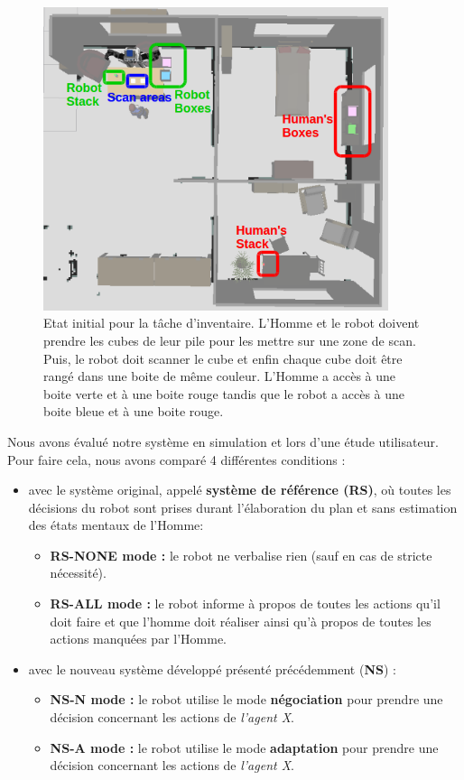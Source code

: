 \documentclass[english,a4paper,11pt,twoside]{StyleThese}
\begin{document}
\begin{figure}[!h]
	\centering
    \includegraphics[width=0.9\textwidth]{figs/Chapter5/SetUpSimu.png}
    \caption{Etat initial pour la tâche d'inventaire. L'Homme et le robot doivent prendre les cubes de leur pile pour les mettre sur une zone de scan. Puis, le robot doit scanner le cube et enfin chaque cube doit être rangé dans une boite de même couleur. L'Homme a accès à une boite verte et à une boite rouge tandis que le robot a accès à une boite bleue et à une boite rouge.}
    \label{fig:setUpSimu}
\end{figure}

Nous avons évalué notre système en simulation et lors d'une étude utilisateur. Pour faire cela, nous avons comparé 4 différentes conditions :
\begin{itemize}
\item avec le système original, appelé \textbf{système de référence (RS)}, où toutes les décisions du robot sont prises durant l'élaboration du plan et sans estimation des états mentaux de l'Homme:
\begin{itemize}
\item \textbf{RS-NONE mode :} le robot ne verbalise rien (sauf en cas de stricte nécessité).
\item \textbf{RS-ALL mode :} le robot informe à propos de toutes les actions qu'il doit faire et que l'homme doit réaliser ainsi qu'à propos de toutes les actions manquées par l'Homme.
\end{itemize}
\item avec le nouveau système développé présenté précédemment (\textbf{NS}) :
\begin{itemize}
\item \textbf{NS-N mode :} le robot utilise le mode \textbf{négociation} pour prendre une décision concernant les actions de \textit{l'agent X}.
\item \textbf{NS-A mode :} le robot utilise le mode \textbf{adaptation} pour prendre une décision concernant les actions de \textit{l'agent X}.
\end{itemize}
\end{itemize}
\end{document}
